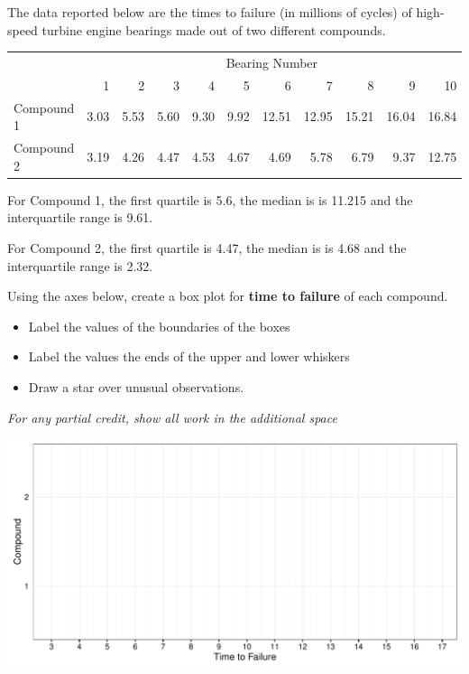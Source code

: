 \documentclass[addpoints]{examsetup}\usepackage[]{graphicx}\usepackage[]{color}
\newenvironment{knitrout}{}{} %
\begin{document}
\begin{questions}
\begin{parts}
   \vspace{2cm}

\end{parts}

\pagebreak

\question[12] 
The data reported below are the times to failure (in millions of cycles) of high-speed turbine engine bearings made out of two different compounds.

\begin{table}[ht]
\centering
\begin{tabular}{lrrrrrrrrrr}
  \hline
  & \multicolumn{10}{c}{Bearing Number} \\
  & 1 & 2 & 3 & 4 & 5 & 6 & 7 & 8 & 9 & 10 \\
 \hline
Compound 1 & 3.03 & 5.53 & 5.60 & 9.30 & 9.92 & 12.51 & 12.95 & 15.21 & 16.04 & 16.84 \\ 
  Compound 2 & 3.19 & 4.26 & 4.47 & 4.53 & 4.67 & 4.69 & 5.78 & 6.79 & 9.37 & 12.75 \\ 
   \hline
\end{tabular}
\end{table}


For Compound 1, the first quartile is 5.6, the median is is 11.215 and the interquartile range is 9.61.

For Compound 2, the first quartile is 4.47, the median is is 4.68 and the interquartile range is 2.32.

\vspace{0.5cm}

Using the axes below, create a box plot for \textbf{time to failure} of each compound.

\begin{itemize}
   \item Label the values of the boundaries of the boxes
   \item Label the values the ends of the upper and lower whiskers
   \item Draw a star over unusual observations.
\end{itemize}

\textit{For any partial credit, show all work in the additional space}

\vspace{1cm}

\begin{knitrout}
\color{fgcolor}
\includegraphics[width=.9\linewidth]{figure/unnamed-chunk-2-1} 


\end{knitrout}
\end{questions}
\end{document}
